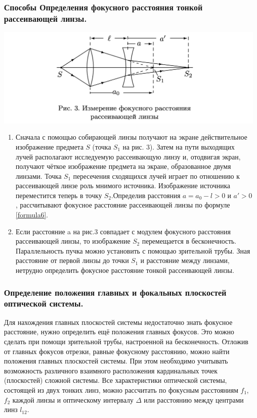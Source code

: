 \documentclass[a4paper,12pt]{article}
\newcommand{\RNumCaps}[1]
{\MakeUppercase{\romannumeral #1}}
\begin{document}
\subsubsection*{Способы Определения фокусного расстояния тонкой рассеивающей линзы.}
\begin{center}
	\includegraphics[width=14cm]{1.1.3.png}
\end{center}
\begin{enumerate}
	\item[\textbf{\RNumCaps{1}}] 
	Сначала с помощью собирающей линзы получают на экране действительное изображение предмета $S$ (точка $S_1$ на рис. 3). Затем на пути  выходящих лучей располагают исследуемую рассеивающую линзу и, отодвигая экран, получают чёткое изображение предмета на экране, образованное двумя линзами. Точка $S_1$ пересечения сходящихся лучей играет по отношению к рассеивающей линзе роль мнимого источника. Изображение источника переместится теперь в точку $S_2$.Определив расстояния $a = a_0 - l > 0$ и $a' > 0$, рассчитывают фокусное расстояние рассеивающей линзы по формуле \eqref{formula6}.
	\item[\textbf{\RNumCaps{2}}] Если расстояние a на рис.3 совпадает с модулем фокусного расстояния рассеивающей линзы, то изображение $S_2$ перемещается в бесконечность. Параллельность пучка можно установить с помощью зрительной трубы. Зная расстояние от первой линзы до точки $S_1$ и расстояние между линзами, нетрудно определить фокусное расстояние тонкой рассеивающей линзы. 
\end{enumerate}


\subsubsection*{Определение положения главных и фокальных плоскостей  оптической системы.}
Для нахождения главных плоскостей системы недостаточно знать фокусное расстояние, нужно определить ещё положения главных фокусов. Это можно сделать при помощи зрительной трубы, настроенной на бесконечность. Отложив от главных фокусов отрезки, равные фокусному расстоянию, можно найти положения главных плоскостей системы. При этом необходимо учитывать возможность различного взаимного расположения кардинальных точек (плоскостей) сложной системы.
Все характеристики оптической системы, состоящей из двух тонких линз, можно рассчитать по фокусным расстояниям $f_1$, $f_2$ каждой линзы и оптическому интервалу $\Delta$ или расстоянию между центрами линз $l_{12}$.
\end{document}
